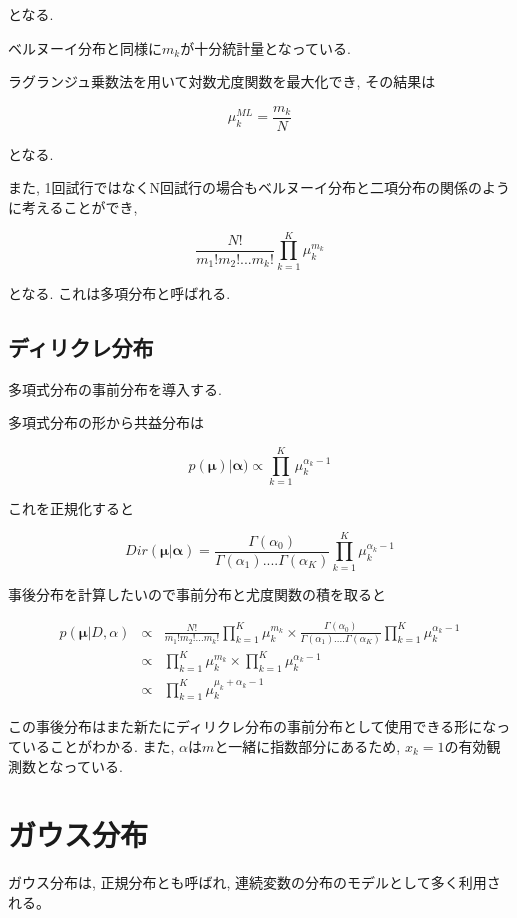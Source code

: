 となる.

ベルヌーイ分布と同様に$m_k$が十分統計量となっている.

ラグランジュ乗数法を用いて対数尤度関数を最大化でき, その結果は

$$ \mu_k^{ML} = \frac{m_k}{N} $$

となる.

また, 1回試行ではなくN回試行の場合もベルヌーイ分布と二項分布の関係のように考えることができ,

$$ \frac{N!}{m_1!m_2!...m_k!}\prod_{k=1}^K \mu_k^{m_k} $$

となる. これは多項分布と呼ばれる.

\subsection{ディリクレ分布}

多項式分布の事前分布を導入する.

多項式分布の形から共益分布は

$$ p(\bm{\mu})|\bm{\alpha}) \propto \prod_{k=1}^K \mu_k^{\alpha_k - 1} $$

これを正規化すると

$$ Dir(\bm{\mu}|\bm{\alpha}) = \frac{\Gamma(\alpha_0)}{\Gamma(\alpha_1)....\Gamma(\alpha_K)}\prod_{k=1}^K \mu_k^{\alpha_k - 1} $$

事後分布を計算したいので事前分布と尤度関数の積を取ると

\begin{eqnarray*}
    p(\bm{\mu}|D, \alpha) &\propto& \frac{N!}{m_1!m_2!...m_k!}\prod_{k=1}^K \mu_k^{m_k} \times \frac{\Gamma(\alpha_0)}{\Gamma(\alpha_1)....\Gamma(\alpha_K)}\prod_{k=1}^K \mu_k^{\alpha_k - 1} \\
    &\propto& \prod_{k=1}^K \mu_k^{m_k} \times \prod_{k=1}^K \mu_k^{\alpha_k - 1} \\
    &\propto& \prod_{k=1}^K \mu_k^{\mu_k + \alpha_k - 1}
\end{eqnarray*}

この事後分布はまた新たにディリクレ分布の事前分布として使用できる形になっていることがわかる.
また, $\alpha$は$m$と一緒に指数部分にあるため, $x_k=1$の有効観測数となっている.

\section{ガウス分布}

ガウス分布は, 正規分布とも呼ばれ, 連続変数の分布のモデルとして多く利用される。

